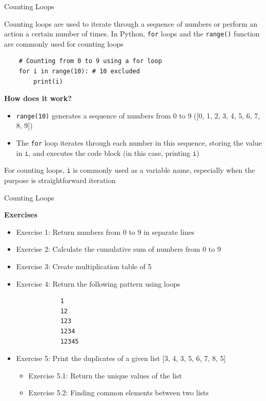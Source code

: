 \documentclass[
	11pt, 
]{beamer}
\begin{document}

\begin{frame}[fragile]{Counting Loops}

Counting loops are used to iterate through a sequence of numbers or perform an action a certain number of times. In Python, \texttt{for} loops and the \texttt{range()} function are commonly used for counting loops

\begin{verbatim}
    # Counting from 0 to 9 using a for loop
    for i in range(10): # 10 excluded
        print(i)
\end{verbatim}

\begin{exampleblock}{\textbf{How does it work?}}
\begin{itemize}
    \item \texttt{range(10)} generates a sequence of numbers from 0 to 9 ([0, 1, 2, 3, 4, 5, 6, 7, 8, 9])
    \item The \texttt{for} loop iterates through each number in this sequence, storing the value in \texttt{i}, and executes the code block (in this case, printing \texttt{i})
\end{itemize}
\end{exampleblock}

\vspace{.1cm}
For counting loops, \texttt{i} is commonly used as a variable name, especially when the purpose is straightforward iteration

\end{frame}


\begin{frame}[fragile]{Counting Loops}

\begin{alertblock}{\textbf{Exercises}}
\begin{itemize}
    \item Exercise 1: Return numbers from 0 to 9 in separate lines
    \item Exercise 2: Calculate the cumulative sum of numbers from 0 to 9
    \item Exercise 3: Create multiplication table of 5
    \item Exercise 4: Return the following pattern using loops
        \begin{verbatim}
            1
            12
            123
            1234
            12345\end{verbatim}
    \item Exercise 5: Print the duplicates of a given list [3, 4, 3, 5, 6, 7, 8, 5]
    \begin{itemize}
        \item Exercise 5.1: Return the unique values of the list
        \item Exercise 5.2: Finding common elements between two lists
    \end{itemize}
\end{itemize}    
\end{alertblock}
\end{frame}
\end{document}
